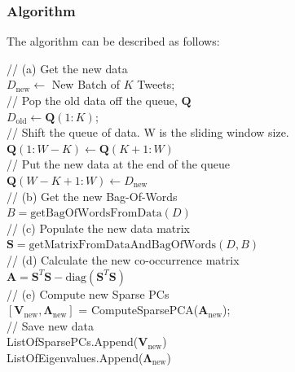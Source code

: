 \documentclass[11pt,a4paper]{article}
\newcommand{\smat}{\mathbf{S}}
\newcommand{\covmat}{\mathbf{A}}
\newcommand{\tp}{^T}
\begin{document}
\subsubsection{Algorithm}
The algorithm can be described as follows:

\LinesNumbered
\begin{algorithm}[H]
 {
//  (a) Get the new data\\
$D_\text{new} \leftarrow $ New Batch of $K$ Tweets;\\
// Pop the old data off the queue, $\mathbf{Q}$\\
$D_\text{old} \leftarrow \mathbf{Q}(1:K)$;\\
// Shift the queue of data. W is the sliding window size.\\
$ \mathbf{Q}(1:W-K) \leftarrow \mathbf{Q}(K+1:W) $\\
// Put the new data at the end of the queue\\
$ \mathbf{Q}(W-K+1:W) \leftarrow D_\text{new}$\\
// (b) Get the new Bag-Of-Words\\
$ B = \text{getBagOfWordsFromData}(D)$\\
// (c) Populate the new data matrix \\
$\smat = \text{getMatrixFromDataAndBagOfWords}(D, B)$\\
// (d) Calculate the new co-occurrence matrix\\
$\covmat = \smat\tp \smat - \text{diag}(\smat\tp \smat) $\\
// (e) Compute new Sparse PCs \\
$[\mathbf{V}_\text{new}, \mathbf{\Lambda}_\text{new}]$ = ComputeSparsePCA($\covmat_\text{new}$);\\
// Save new data\\
ListOfSparsePCs.Append($\mathbf{V}_\text{new}$)\\
ListOfEigenvalues.Append($\mathbf{\Lambda}_\text{new}$)\\

}
\end{algorithm}
\end{document}
